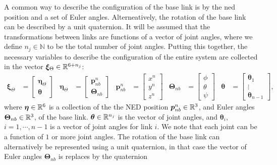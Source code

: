 A common way to describe the configuration of the base link is by the \gls{ned}
position and a set of Euler angles. Alterneatively, the rotation of the base link
can be described by a unit quaternion. It will be assumed that the transformations
between links are functions of a vector of joint angles, where we define
$n_j \in \mathbb{N}$ to be the total number of joint angles. Putting this together,
the necessary variables to describe the configuration of the entire system are
collected in the vector $\bm{\xi}_{\Theta} \in \mathbb{R}^{6+n_j}$:
\begin{align}
    \bm{\xi}_{\Theta} &= \begin{bmatrix}\bm{\eta}_{\Theta} \\ \bm{\theta} \end{bmatrix} &
        \bm{\eta}_{\Theta} &= \begin{bmatrix}\bm{p}_{nb}^n \\ \bm{\Theta}_{nb} \end{bmatrix} &
            \bm{p}_{nb}^n &= \begin{bmatrix}x^n \\ y^n \\ z^n \end{bmatrix} &
                \bm{\Theta}_{nb} &= \begin{bmatrix}\phi \\ \theta \\ \psi \end{bmatrix} &
                    \bm{\theta} &= \begin{bmatrix}\bm{\theta}_1 \\ \vdots \\ \bm{\theta}_{n-1}\end{bmatrix},
\end{align}
where $\bm{\eta} \in \mathbb{R}^6$ is a collection of the the NED position $\bm{p}_{nb}^n \in \mathbb{R}^3$,
and Euler angles $\bm{\Theta}_{nb} \in \mathbb{R}^3$, of the base
link. $\bm{\theta} \in \mathbb{R}^{n_j}$ is the vector of joint angles, and $\bm{\theta}_i$, $i = 1,\cdots,n-1$
is a vector of joint angles for link $i$. We note that each joint can be a function of $1$ or
more joint angles.
The rotation of the base link can alternatively be represented using a unit quaternion,
in that case the vector of Euler angles $\bm{\Theta}_{nb}$ is replaces by the quaternion

